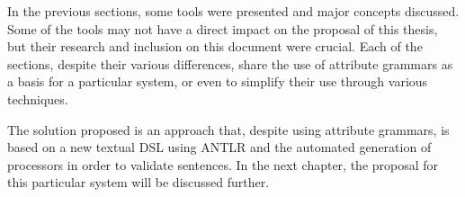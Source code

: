 In the previous sections, some tools were presented and major concepts discussed.
Some of the tools may not have a direct impact on the proposal of this thesis, but their research and inclusion on this document were crucial.
Each of the sections, despite their various differences, share the use of attribute grammars as a basis for a particular system, or even to simplify their use through various techniques.

The solution proposed is an approach that, despite using attribute grammars, 
is based on a new textual \textsc{DSL} using \textsc{ANTLR} and the automated generation of processors in order to validate sentences.
In the next chapter, the proposal for this particular system will be discussed further.


